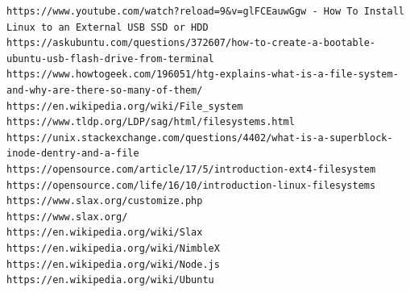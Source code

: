 \documentclass[12pt,vi]{mitthesis}
\begin{document}
\begin{lstlisting}[style=BashInputStyle]
https://www.youtube.com/watch?reload=9&v=glFCEauwGgw - How To Install Linux to an External USB SSD or HDD
https://askubuntu.com/questions/372607/how-to-create-a-bootable-ubuntu-usb-flash-drive-from-terminal
https://www.howtogeek.com/196051/htg-explains-what-is-a-file-system-and-why-are-there-so-many-of-them/
https://en.wikipedia.org/wiki/File_system
https://www.tldp.org/LDP/sag/html/filesystems.html
https://unix.stackexchange.com/questions/4402/what-is-a-superblock-inode-dentry-and-a-file
https://opensource.com/article/17/5/introduction-ext4-filesystem
https://opensource.com/life/16/10/introduction-linux-filesystems
https://www.slax.org/customize.php
https://www.slax.org/
https://en.wikipedia.org/wiki/Slax
https://en.wikipedia.org/wiki/NimbleX
https://en.wikipedia.org/wiki/Node.js
https://en.wikipedia.org/wiki/Ubuntu
\end{lstlisting}
\end{document}
